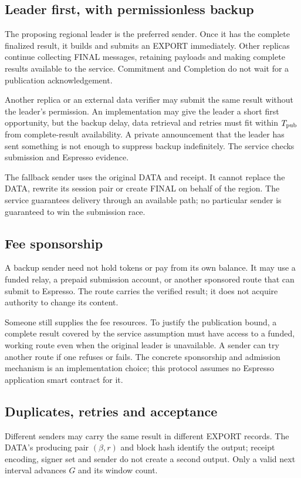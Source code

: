 \documentclass[11pt,a4paper]{article}
\newcounter{protocol}
\begin{document}
\subsection{Leader first, with permissionless backup}
The proposing regional leader is the preferred sender. Once it has the
complete finalized result, it builds and submits an EXPORT immediately.
Other replicas continue collecting FINAL messages, retaining payloads and
making complete results available to the service. Commitment and
Completion do not wait for a publication acknowledgement.

Another replica or an external data verifier may submit the same result
without the leader's permission. An implementation may give the leader a
short first opportunity, but the backup delay, data retrieval and retries
must fit within $T_{\rm pub}$ from complete-result availability. A private
announcement that the leader has sent something is not enough to suppress
backup indefinitely. The service checks submission and Espresso evidence.

The fallback sender uses the original DATA and receipt. It cannot replace
the DATA, rewrite its session pair or create FINAL on behalf of the region.
The service guarantees delivery through an available path; no particular
sender is guaranteed to win the submission race.

\subsection{Fee sponsorship}
A backup sender need not hold tokens or pay from its own balance. It may
use a funded relay, a prepaid submission account, or another sponsored
route that can submit to Espresso. The route carries the verified result;
it does not acquire authority to change its content.

Someone still supplies the fee resources. To justify the publication
bound, a complete result covered by the service assumption must have access to a funded,
working route even when the original leader is unavailable. A sender can
try another route if one refuses or fails. The concrete sponsorship and
admission mechanism is an implementation choice; this protocol assumes
no Espresso application smart contract for it.

\subsection{Duplicates, retries and acceptance}
Different senders may carry the same result in different EXPORT records.
The DATA's producing pair $(\beta,r)$ and block hash identify the output;
receipt encoding, signer set and sender do not create a second output.
Only a valid next interval advances $G$ and its window count.
\end{document}
